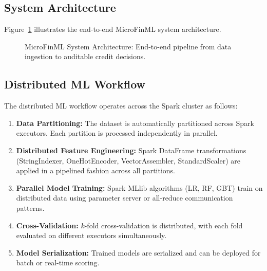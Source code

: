 \documentclass[runningheads]{llncs}
\begin{document}
\subsection{System Architecture}

Figure~\ref{fig:architecture} illustrates the end-to-end MicroFinML system architecture.

\begin{figure}[H]
    \centering
    \caption{MicroFinML System Architecture: End-to-end pipeline from data ingestion to auditable credit decisions.}
    \label{fig:architecture}
\end{figure}

\subsection{Distributed ML Workflow}

The distributed ML workflow operates across the Spark cluster as follows:

\begin{enumerate}
    \item \textbf{Data Partitioning:} The dataset is automatically partitioned across Spark executors. Each partition is processed independently in parallel.
    \item \textbf{Distributed Feature Engineering:} Spark DataFrame transformations (StringIndexer, OneHotEncoder, VectorAssembler, StandardScaler) are applied in a pipelined fashion across all partitions.
    \item \textbf{Parallel Model Training:} Spark MLlib algorithms (LR, RF, GBT) train on distributed data using parameter server or all-reduce communication patterns.
    \item \textbf{Cross-Validation:} $k$-fold cross-validation is distributed, with each fold evaluated on different executors simultaneously.
    \item \textbf{Model Serialization:} Trained models are serialized and can be deployed for batch or real-time scoring.
\end{enumerate}
\end{document}
